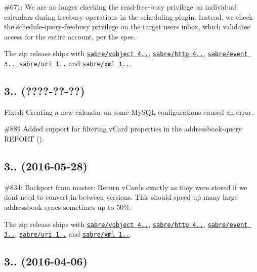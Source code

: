 \begin{DoxyItemize}
\item \#671\+: We are no longer checking the {\ttfamily read-\/free-\/busy} privilege on individual calendars during freebusy operations in the scheduling plugin. Instead, we check the {\ttfamily schedule-\/query-\/freebusy} privilege on the target users\textquotesingle{} inbox, which validates access for the entire account, per the spec.
\item The zip release ships with \href{http://sabre.io/vobject/}{\tt sabre/vobject 4..}, \href{http://sabre.io/http/}{\tt sabre/http 4..}, \href{http://sabre.io/event/}{\tt sabre/event 3..}, \href{http://sabre.io/uri/}{\tt sabre/uri 1..} and \href{http://sabre.io/xml/}{\tt sabre/xml 1..}.
\end{DoxyItemize}

\subsection*{3.. (????-\/??-\/??) }


\begin{DoxyItemize}
\item Fixed\+: Creating a new calendar on some My\+S\+QL configurations caused an error.
\item \#889 Added support for filtering v\+Card properties in the addressbook-\/query R\+E\+P\+O\+RT ().
\end{DoxyItemize}

\subsection*{3.. (2016-\/05-\/28) }


\begin{DoxyItemize}
\item \#834\+: Backport from {\ttfamily master}\+: Return v\+Cards exactly as they were stored if we don\textquotesingle{}t need to convert in between versions. This should speed up many large addressbook syncs sometimes up to 50\%.
\item The zip release ships with \href{http://sabre.io/vobject/}{\tt sabre/vobject 4..}, \href{http://sabre.io/http/}{\tt sabre/http 4..}, \href{http://sabre.io/event/}{\tt sabre/event 3..}, \href{http://sabre.io/uri/}{\tt sabre/uri 1..} and \href{http://sabre.io/xml/}{\tt sabre/xml 1..}.
\end{DoxyItemize}

\subsection*{3.. (2016-\/04-\/06) }



